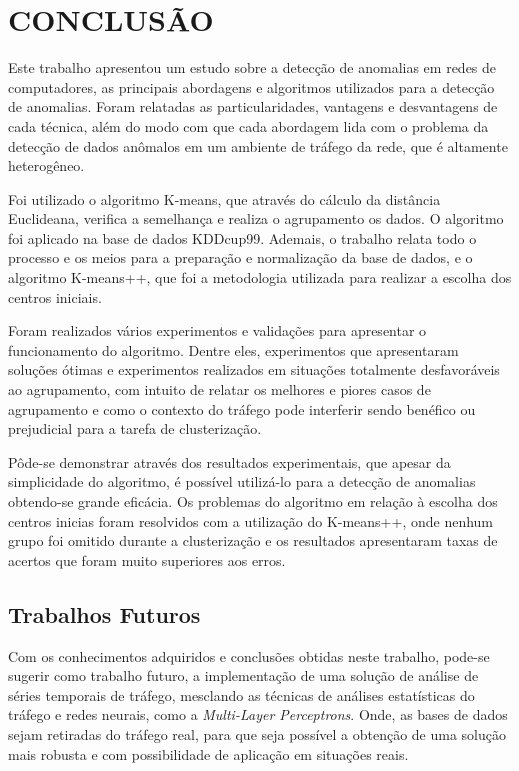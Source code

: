 \chapter{CONCLUSÃO}

\indent Este trabalho apresentou um estudo sobre a detecção de anomalias em redes de computadores, as principais abordagens e algoritmos utilizados para a detecção de anomalias. Foram relatadas as particularidades, vantagens e desvantagens de cada técnica, além do modo com que cada abordagem lida com o problema da detecção de dados anômalos em um ambiente de tráfego da rede, que é altamente heterogêneo.

\indent Foi utilizado o algoritmo K-means, que através do cálculo da distância Euclideana, verifica a semelhança e realiza o agrupamento os dados. O algoritmo foi aplicado na base de dados KDDcup99. Ademais, o trabalho relata todo o processo e os meios para a preparação e normalização da base de dados, e o algoritmo K-means++, que foi a metodologia utilizada para realizar a escolha dos centros iniciais.

\indent Foram realizados vários experimentos e validações para apresentar o funcionamento do algoritmo. Dentre eles, experimentos que apresentaram soluções ótimas e experimentos realizados em situações totalmente desfavoráveis ao agrupamento, com intuito de relatar os melhores e piores casos de agrupamento e como o contexto do tráfego pode interferir sendo benéfico ou prejudicial para a tarefa de clusterização.

\indent Pôde-se demonstrar através dos resultados experimentais, que apesar da simplicidade do algoritmo, é possível utilizá-lo para a detecção de anomalias obtendo-se grande eficácia. Os problemas do algoritmo em relação à escolha dos centros inicias foram resolvidos com a utilização do K-means++, onde nenhum grupo foi omitido durante a clusterização e os resultados apresentaram taxas de acertos que foram muito superiores aos erros.

\section{Trabalhos Futuros}

\indent Com os conhecimentos adquiridos e conclusões obtidas neste trabalho, pode-se sugerir como trabalho futuro, a implementação de uma solução de análise de séries temporais de tráfego, mesclando as técnicas de análises estatísticas do tráfego e redes neurais, como a \textit{Multi-Layer Perceptrons}. Onde, as bases de dados sejam retiradas do tráfego real, para que seja possível a obtenção de uma solução mais robusta e com possibilidade de aplicação em situações reais.
